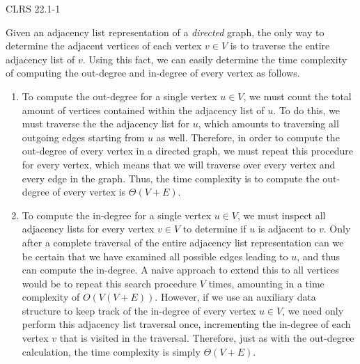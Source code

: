 \documentclass[11pt]{article}
\begin{document}
\begin{prob}{1}
CLRS 22.1-1 
\end{prob}
\begin{sol} 

Given an adjacency list representation of a \emph{directed} graph, the only way to determine the adjacent vertices of each vertex $v \in V$ is to traverse the entire adjacency list of $v$. Using this fact, we can easily determine the time complexity of computing the out-degree and in-degree of every vertex as follows.

\begin{enumerate}
	\item To compute the out-degree for a single vertex $u \in V$, we must count the total amount of vertices contained within the adjacency list of $u$. To do this, we must traverse the the adjacency list for $u$, which amounts to traversing all outgoing edges starting from $u$ as well. Therefore, in order to compute the out-degree of every vertex in a directed graph, we must repeat this procedure for every vertex, which means that we will traverse over every vertex and every edge in the graph. Thus, the time complexity is to compute the out-degree of every vertex is $\Theta(V+ E)$.
	\item To compute the in-degree for a single vertex $u \in V$, we must inspect all adjacency lists for every vertex $v \in V$ to determine if $u$ is adjacent to $v$. Only after a complete traversal of the entire adjacency list representation can we be certain that we have examined all possible edges leading to $u$, and thus can compute the in-degree. A naive approach to extend this to all vertices would be to repeat this search procedure $V$ times, amounting in a time complexity of $O(V(V+E))$. However, if we use an auxiliary data structure to keep track of the in-degree of every vertex $u \in V$, we need only perform this adjacency list traversal once, incrementing the in-degree of each vertex $v$ that is visited in the traversal. Therefore, just as with the out-degree calculation, the time complexity is simply $\Theta(V + E)$.
\end{enumerate}

\end{sol}
\end{document}

